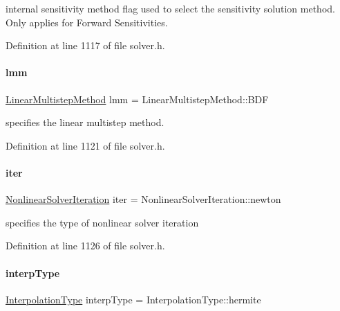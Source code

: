 internal sensitivity method flag used to select the sensitivity solution method. Only applies for Forward Sensitivities. 

Definition at line 1117 of file solver.\+h.

\mbox{\label{classamici_1_1_solver_af71d1353291520f9ba68df79c4b9f053}} 
\paragraph{\texorpdfstring{lmm}{lmm}}
{\footnotesize\ttfamily \mbox{\hyperlink{namespaceamici_a9ebe272482a8e073efe7078b7e96e8bc}{Linear\+Multistep\+Method}} lmm = Linear\+Multistep\+Method\+::\+B\+DF\hspace{0.3cm}{\ttfamily [protected]}}

specifies the linear multistep method. 

Definition at line 1121 of file solver.\+h.

\mbox{\label{classamici_1_1_solver_a0ef59d3f746d2ec0e3f126b7b9989f50}} 
\paragraph{\texorpdfstring{iter}{iter}}
{\footnotesize\ttfamily \mbox{\hyperlink{namespaceamici_a13388d34e4c35bb592c3e821c35cc923}{Nonlinear\+Solver\+Iteration}} iter = Nonlinear\+Solver\+Iteration\+::newton\hspace{0.3cm}{\ttfamily [protected]}}

specifies the type of nonlinear solver iteration 

Definition at line 1126 of file solver.\+h.

\mbox{\label{classamici_1_1_solver_a5a80193af5ca74a4a4e3da67a7e74a98}} 
\paragraph{\texorpdfstring{interp\+Type}{interpType}}
{\footnotesize\ttfamily \mbox{\hyperlink{namespaceamici_a8472f01c511d77bbfb981a46618ea1ea}{Interpolation\+Type}} interp\+Type = Interpolation\+Type\+::hermite\hspace{0.3cm}{\ttfamily [protected]}}

